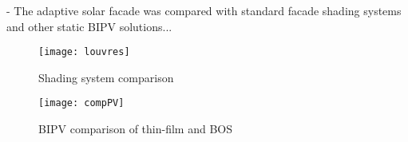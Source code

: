 
- The adaptive solar facade was compared with standard facade shading systems and other static BIPV solutions...

\begin{figure}[H]
\begin{center}
\texttt{[image: louvres]}
\caption{Shading system comparison}
\label{fig:louvres}
\end{center}
\end{figure}

\begin{figure}[H]
\begin{center}
\texttt{[image: compPV]}
\caption{BIPV comparison of thin-film and BOS}
\label{fig:compPV}
\end{center}
\end{figure}